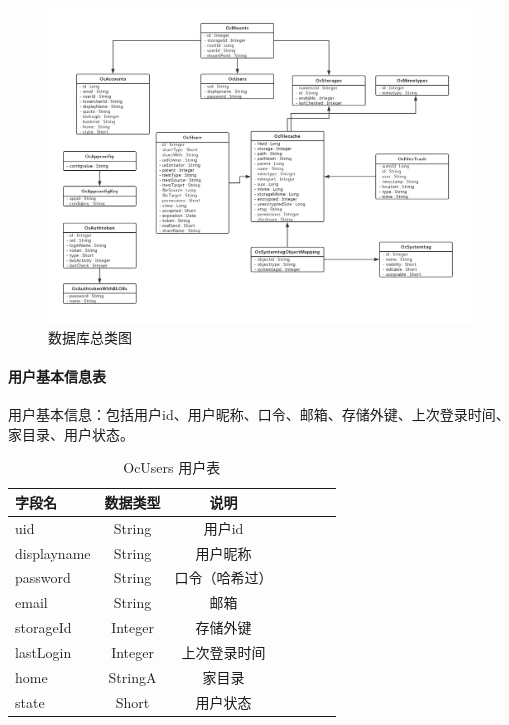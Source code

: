 \begin{figure}[H]
    \centering
    \includegraphics[width=130mm]{./figures/classes.png}
    \caption{数据库总类图}
  \end{figure}

\paragraph{用户基本信息表}
用户基本信息：包括用户id、用户昵称、口令、邮箱、存储外键、上次登录时间、家目录、用户状态。

\begin{table}[htbp]\center
    \caption{OcUsers 用户表}
    \begin{tabular}{lcccccl}
     \toprule
     字段名 & 数据类型 & 说明 \\
     \midrule
     uid         & String  &  用户id        \\
    displayname  & String  &  用户昵称      \\
    password     & String  &  口令（哈希过）\\      
    email        & String  &  邮箱          \\
    storageId    & Integer &  存储外键      \\
    lastLogin    & Integer &  上次登录时间  \\
    home         & StringA &  家目录       \\
    state        & Short   &  用户状态      \\
     \bottomrule
    \end{tabular}
    \label{user_table}    
   \end{table}

